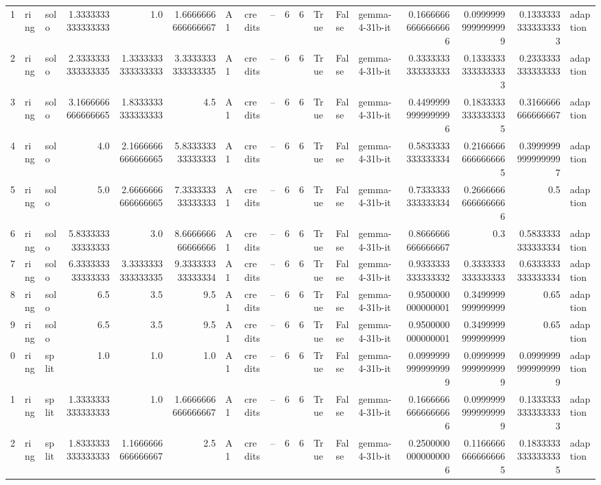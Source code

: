 \documentclass[11pt,a4paper]{article}
\begin{document}
\begin{table}[htbp]
\begin{tabular}{rllrrrlllrrlllrrrl}
1 & ring & solo & 1.3333333333333333 & 1.0 & 1.6666666666666667 & A1 & credits & -- & 6 & 6 & True & False & gemma-4-31b-it & 0.16666666666666666 & 0.09999999999999999 & 0.13333333333333333 & adaption \\
2 & ring & solo & 2.3333333333333335 & 1.3333333333333333 & 3.3333333333333335 & A1 & credits & -- & 6 & 6 & True & False & gemma-4-31b-it & 0.3333333333333333 & 0.13333333333333333 & 0.2333333333333333 & adaption \\
3 & ring & solo & 3.1666666666666665 & 1.8333333333333333 & 4.5 & A1 & credits & -- & 6 & 6 & True & False & gemma-4-31b-it & 0.44999999999999996 & 0.18333333333333335 & 0.3166666666666667 & adaption \\
4 & ring & solo & 4.0 & 2.1666666666666665 & 5.833333333333333 & A1 & credits & -- & 6 & 6 & True & False & gemma-4-31b-it & 0.5833333333333334 & 0.21666666666666665 & 0.39999999999999997 & adaption \\
5 & ring & solo & 5.0 & 2.6666666666666665 & 7.333333333333333 & A1 & credits & -- & 6 & 6 & True & False & gemma-4-31b-it & 0.7333333333333334 & 0.26666666666666666 & 0.5 & adaption \\
6 & ring & solo & 5.833333333333333 & 3.0 & 8.666666666666666 & A1 & credits & -- & 6 & 6 & True & False & gemma-4-31b-it & 0.8666666666666667 & 0.3 & 0.5833333333333334 & adaption \\
7 & ring & solo & 6.333333333333333 & 3.3333333333333335 & 9.333333333333334 & A1 & credits & -- & 6 & 6 & True & False & gemma-4-31b-it & 0.9333333333333332 & 0.3333333333333333 & 0.6333333333333334 & adaption \\
8 & ring & solo & 6.5 & 3.5 & 9.5 & A1 & credits & -- & 6 & 6 & True & False & gemma-4-31b-it & 0.9500000000000001 & 0.3499999999999999 & 0.65 & adaption \\
9 & ring & solo & 6.5 & 3.5 & 9.5 & A1 & credits & -- & 6 & 6 & True & False & gemma-4-31b-it & 0.9500000000000001 & 0.3499999999999999 & 0.65 & adaption \\
0 & ring & split & 1.0 & 1.0 & 1.0 & A1 & credits & -- & 6 & 6 & True & False & gemma-4-31b-it & 0.09999999999999999 & 0.09999999999999999 & 0.09999999999999999 & adaption \\
1 & ring & split & 1.3333333333333333 & 1.0 & 1.6666666666666667 & A1 & credits & -- & 6 & 6 & True & False & gemma-4-31b-it & 0.16666666666666666 & 0.09999999999999999 & 0.13333333333333333 & adaption \\
2 & ring & split & 1.8333333333333333 & 1.1666666666666667 & 2.5 & A1 & credits & -- & 6 & 6 & True & False & gemma-4-31b-it & 0.25000000000000006 & 0.11666666666666665 & 0.18333333333333335 & adaption \\

\end{tabular}
\end{table}
\end{document}
